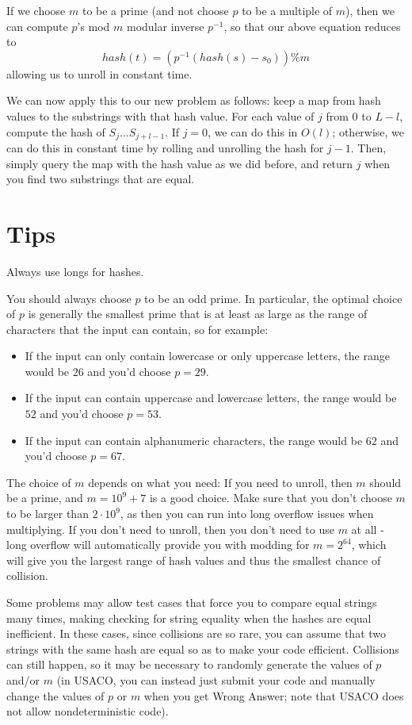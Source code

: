 \documentclass{article}
\begin{document}
If we choose $m$ to be a prime (and not choose $p$ to be a multiple of $m$), then we can compute $p$'s mod $m$ modular inverse $p^{-1}$, so that our above equation reduces to
$$hash(t) = (p^{-1}(hash(s) - s_0)) \% m$$
allowing us to unroll in constant time.

We can now apply this to our new problem as follows: keep a map from hash values to the substrings with that hash value. For each value of $j$ from $0$ to $L - l$, compute the hash of $S_j...S_{j + l - 1}$. If $j = 0$, we can do this in $O(l)$; otherwise, we can do this in constant time by rolling and unrolling the hash for $j - 1$. Then, simply query the map with the hash value as we did before, and return $j$ when you find two substrings that are equal.

\section{Tips}
Always use longs for hashes.

You should always choose $p$ to be an odd prime. In particular, the optimal choice of $p$ is generally the smallest prime that is at least as large as the range of characters that the input can contain, so for example:
\begin{itemize}
    \item If the input can only contain lowercase or only uppercase letters, the range would be $26$ and you'd choose $p = 29$.
    \item If the input can contain uppercase and lowercase letters, the range would be $52$ and you'd choose $p = 53$.
    \item If the input can contain alphanumeric characters, the range would be $62$ and you'd choose $p = 67$.
\end{itemize}

The choice of $m$ depends on what you need:
If you need to unroll, then $m$ should be a prime, and $m = 10^9 + 7$ is a good choice. Make sure that you don't choose $m$ to be larger than $2\cdot 10^9$, as then you can run into long overflow issues when multiplying.
If you don't need to unroll, then you don't need to use $m$ at all - long overflow will automatically provide you with modding for $m = 2^64$, which will give you the largest range of hash values and thus the smallest chance of collision.

Some problems may allow test cases that force you to compare equal strings many times, making checking for string equality when the hashes are equal inefficient. In these cases, since collisions are so rare, you can assume that two strings with the same hash are equal so as to make your code efficient. Collisions can still happen, so it may be necessary to randomly generate the values of $p$ and/or $m$ (in USACO, you can instead just submit your code and manually change the values of $p$ or $m$ when you get Wrong Answer; note that USACO does not allow nondeterministic code).
\end{document}

